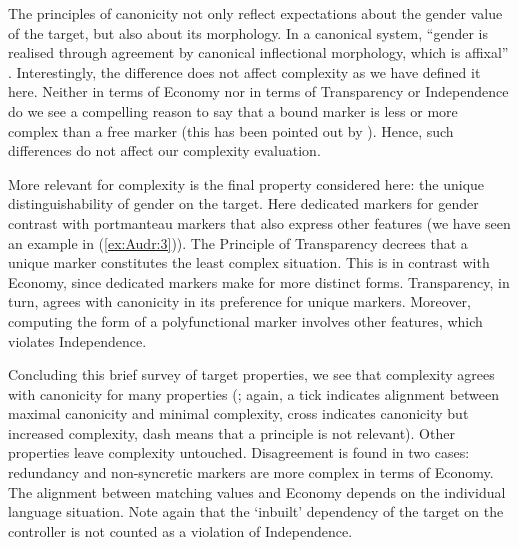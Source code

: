 \documentclass[output=collectionpaper]{langsci/langscibook}
\begin{document}
The principles of canonicity not only reflect expectations about the gender value of the target, but also about its morphology. In a canonical system, ``gender is realised through agreement by canonical inflectional morphology, which is affixal'' \citep[509]{Corbett2016}. Interestingly, the difference does not affect complexity as we have defined it here. Neither in terms of Economy nor in terms of Transparency or Independence do we see a compelling reason to say that a bound marker is less or more complex than a free marker (this has been pointed out by \citealt{Leufkens2014}). Hence, such differences do not affect our complexity evaluation.

More relevant for complexity is the final property considered here: the unique distinguishability of gender on the target. Here dedicated markers for gender contrast with portmanteau markers that also express other features (we have seen an example in (\ref{ex:Audr:3})). The Principle of Transparency decrees that a unique marker constitutes the least complex situation. This is in contrast with Economy, since dedicated markers make for more distinct forms. Transparency, in turn, agrees with canonicity in its preference for unique markers. Moreover, computing the form of a polyfunctional marker involves other features, which violates Independence.

Concluding this brief survey of target properties, we see that complexity agrees with canonicity for many properties (; again, a tick indicates alignment between maximal canonicity and minimal complexity, cross indicates canonicity but increased complexity, dash means that a principle is not relevant). Other properties leave complexity untouched. Disagreement is found in two cases: redundancy and non-syncretic markers are more complex in terms of Economy. The alignment between matching values and Economy depends on the individual language situation. Note again that the `inbuilt' dependency of the target on the controller is not counted as a violation of Independence.
\end{document}
